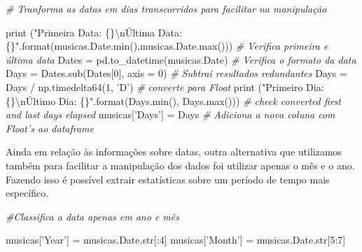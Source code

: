 \documentclass[11pt]{article}
\newenvironment{Shaded}{}{}
\newcommand{\DecValTok}[1]{\textcolor[rgb]{0.25,0.63,0.44}{{#1}}}
\newcommand{\CharTok}[1]{\textcolor[rgb]{0.25,0.44,0.63}{{#1}}}
\newcommand{\StringTok}[1]{\textcolor[rgb]{0.25,0.44,0.63}{{#1}}}
\newcommand{\CommentTok}[1]{\textcolor[rgb]{0.38,0.63,0.69}{\textit{{#1}}}}
\newcommand{\NormalTok}[1]{{#1}}
\newcommand{\SpecialCharTok}[1]{\textcolor[rgb]{0.25,0.44,0.63}{{#1}}}
\newcommand{\OperatorTok}[1]{\textcolor[rgb]{0.40,0.40,0.40}{{#1}}}
\newcommand{\BuiltInTok}[1]{{#1}}
\begin{document}
    \begin{Shaded}
\begin{Highlighting}[]
    \CommentTok{# Tranforma as datas em dias transcorridos para facilitar na manipulação}

\BuiltInTok{print}\NormalTok{ (}\StringTok{"Primeira Data: }\SpecialCharTok{\{\}}\CharTok{\textbackslash{}n}\StringTok{Última Data: }\SpecialCharTok{\{\}}\StringTok{"}\NormalTok{.}\BuiltInTok{format}\NormalTok{(musicas.Date.}\BuiltInTok{min}\NormalTok{(),musicas.Date.}\BuiltInTok{max}\NormalTok{())) }\CommentTok{# Verifica primeira e última data}
\NormalTok{Dates }\OperatorTok{=}\NormalTok{ pd.to_datetime(musicas.Date) }\CommentTok{# Verifica o formato da data}
\NormalTok{Days }\OperatorTok{=}\NormalTok{ Dates.sub(Dates[}\DecValTok{0}\NormalTok{], axis }\OperatorTok{=} \DecValTok{0}\NormalTok{) }\CommentTok{# Subtrai resultados redundantes}
\NormalTok{Days }\OperatorTok{=}\NormalTok{ Days }\OperatorTok{/}\NormalTok{ np.timedelta64(}\DecValTok{1}\NormalTok{, }\StringTok{'D'}\NormalTok{) }\CommentTok{# converte para Float}
\BuiltInTok{print}\NormalTok{ (}\StringTok{"Primeiro Dia: }\SpecialCharTok{\{\}}\CharTok{\textbackslash{}n}\StringTok{Último Dia: }\SpecialCharTok{\{\}}\StringTok{"}\NormalTok{.}\BuiltInTok{format}\NormalTok{(Days.}\BuiltInTok{min}\NormalTok{(), Days.}\BuiltInTok{max}\NormalTok{())) }\CommentTok{# check converted first and last days elapsed}
\NormalTok{musicas[}\StringTok{'Days'}\NormalTok{] }\OperatorTok{=}\NormalTok{ Days }\CommentTok{# Adiciona a nova coluna com Float's ao dataframe}
\end{Highlighting}
\end{Shaded}

    Ainda em relação às informações sobre datas, outra alternativa que
utilizamos também para facilitar a manipulação dos dados foi utilizar
apenas o mês e o ano. Fazendo isso é possível extrair estatísticas sobre
um período de tempo mais específico.

    \begin{Shaded}
\begin{Highlighting}[]
    \CommentTok{#Classifica a data apenas em ano e mês}

\NormalTok{musicas[}\StringTok{'Year'}\NormalTok{] }\OperatorTok{=}\NormalTok{ musicas.Date.}\BuiltInTok{str}\NormalTok{[:}\DecValTok{4}\NormalTok{]}
\NormalTok{musicas[}\StringTok{'Month'}\NormalTok{] }\OperatorTok{=}\NormalTok{ musicas.Date.}\BuiltInTok{str}\NormalTok{[}\DecValTok{5}\NormalTok{:}\DecValTok{7}\NormalTok{]}
\end{Highlighting}
\end{Shaded}
\end{document}
